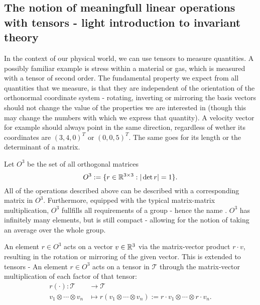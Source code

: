 \subsection{The notion of meaningfull linear operations with tensors - light introduction to invariant theory}
In the context of our physical world, we can use tensors to measure quantities. A possibly familiar example is stress within a material or gas, which is measured with a tensor of second order. 
The fundamental property we expect from all quantities that we measure, is that they are independent of the orientation of the orthonormal coordinate system - rotating, inverting or mirroring the basis vectors should not change the value of the properties we are interested in (though this may change the numbers with which we express that quantity).
A velocity vector for example should always point in the same direction, regardless of wether its coordinates are $(3,4,0)^T$ or $(0,0,5)^T$. The same goes for its length or the determinant of a matrix.

\begin{definition}
	Let $O^3$ be the set of all orthogonal matrices \[O^3:=\{r\in\mathbb{R}^{3\times 3}: |\det{r}| = 1 \}.\] 
	All of the operations described above can be described with a corresponding matrix in $O^3$. Furthermore, equipped with the typical matrix-matrix multiplication, $O^3$ fullfills all requirements of a group - hence the name . $O^3$ has infinitely many elements, but is still compact - allowing for the notion of taking an average over the whole group.
\end{definition}

\begin{definition}
	An element $r\in O^3$ acts on a vector $v\in\mathbb{R}^3$ via the matrix-vector product $r\cdot v$, resulting in the rotation or mirroring of the given vector. This is extended to tensors - An element $r\in O^3$ acts on a tensor in $\mathcal{T}$ through the matrix-vector multiplication of each factor of that tensor:
	\begin{align*}
		r(\cdot):\mathcal{T} &\to \mathcal{T}\\
		v_1 \otimes \cdots \otimes v_n&\mapsto r(v_1 \otimes \cdots \otimes v_n) :=r\cdot v_1 \otimes \cdots \otimes r\cdot v_n.
	\end{align*}
\end{definition}

